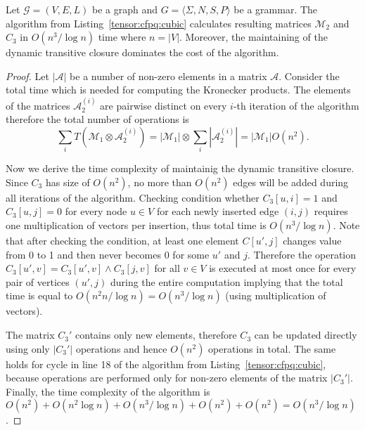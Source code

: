 \begin{theorem}{}
    Let $\mathcal{G} = (V,E,L)$ be a graph and $G = \langle\Sigma, N, S, P\rangle$ be a grammar.
    The algorithm from Listing~\ref{tensor:cfpq:cubic} calculates resulting matrices $\mathcal{M}_2$ and $C_3$ in $O(n^3/\log n)$ time where $n = |V|$. Moreover, the maintaining of the dynamic transitive closure dominates the cost of the algorithm.
\end{theorem}

\begin{proof}
 Let $|\mathcal{A}|$ be a number of non-zero elements in a matrix $\mathcal{A}$. Consider the total time which is needed for computing the Kronecker products. The elements of the matrices $\mathcal{A}_2^{(i)}$ are pairwise distinct on every $i$-th iteration of the algorithm therefore the total number of operations is
 $$\sum\limits_i{T(\mathcal{M}_1 \otimes \mathcal{A}_2^{(i)})} = |\mathcal{M}_1| \otimes \sum\limits_i {|\mathcal{A}_2^{(i)}|} = |\mathcal{M}_1|O(n^2).$$


Now we derive the time complexity of maintainig the dynamic transitive closure.
Since $C_3$ has size of $O(n^2)$, no more than $O(n^2)$ edges will be added during all iterations of the algorithm.
Checking condition whether $C_3[u, i] = 1$ and $C_3[u, j]=0$ for every node $u \in V$ for each newly inserted edge $(i, j)$ requires one multiplication of vectors per insertion, thus total time is $O(n^3/\log n)$.
Note that after checking the condition, at least one element $C[u', j]$ changes value from 0 to 1 and then never becomes 0 for some $u'$ and $j$.
Therefore the operation $C_3[u',v] = C_3[u', v] \wedge C_3[j, v]$ for all $v \in V$ is executed at most once for every pair of vertices $(u',j)$ during the entire computation implying that the total time is equal to $O(n^2n/\log n)=O(n^3/\log n)$ (using multiplication of vectors).


The matrix $C_3'$ contains only new elements, therefore $C_3$ can be updated directly using only $|C_3'|$ operations and hence $O(n^2)$ operations in total.
The same holds for cycle in line 18 of the algorithm from Listing~\ref{tensor:cfpq:cubic}, because operations are performed only for non-zero elements of the matrix $|C_3'|$.
Finally, the time complexity of the algorithm is $O(n^2) + O(n^2 \log n) + O(n^3/\log n) + O(n^2) + O(n^2) = O(n^3/\log n)$.
\end{proof}{}

